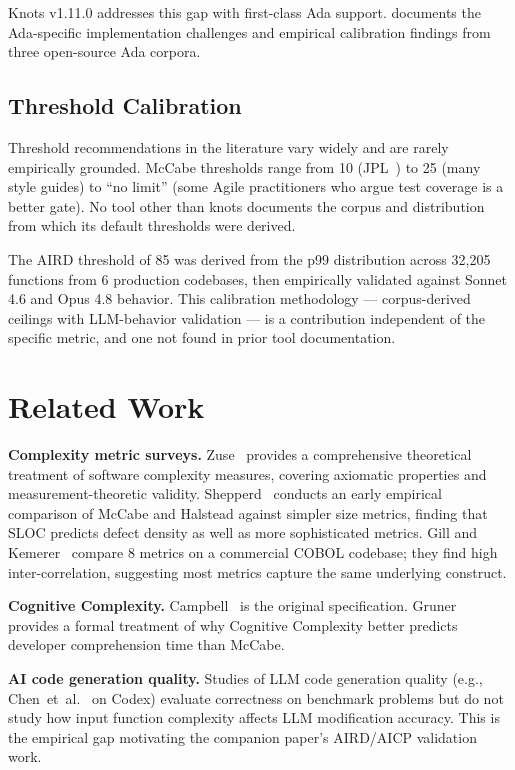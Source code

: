 \documentclass[10pt,twocolumn,letterpaper]{article}
\begin{document}
Knots v1.11.0 addresses this gap with first-class Ada support.
 documents the Ada-specific implementation
challenges and empirical calibration findings from three open-source Ada
corpora.

\subsection{Threshold Calibration}

Threshold recommendations in the literature vary widely and are rarely
empirically grounded.  McCabe thresholds range from 10 (JPL~\cite{jpl})
to 25 (many style guides) to ``no limit'' (some Agile practitioners who
argue test coverage is a better gate).  No tool other than knots documents
the corpus and distribution from which its default thresholds were derived.

The AIRD threshold of 85 was derived from the p99 distribution across
32,205 functions from 6 production codebases, then empirically validated
against Sonnet 4.6 and Opus 4.8 behavior.  This calibration methodology
--- corpus-derived ceilings with LLM-behavior validation --- is
a contribution independent of the specific metric, and one not found in
prior tool documentation.

\section{Related Work}
\label{sec:related}

\textbf{Complexity metric surveys.}
Zuse~\cite{zuse} provides a comprehensive theoretical treatment of software
complexity measures, covering axiomatic properties and measurement-theoretic
validity.  Shepperd~\cite{shepperd} conducts an early empirical comparison
of McCabe and Halstead against simpler size metrics, finding that SLOC
predicts defect density as well as more sophisticated metrics.  Gill and
Kemerer~\cite{gill-kemerer} compare 8 metrics on a commercial COBOL
codebase; they find high inter-correlation, suggesting most metrics capture
the same underlying construct.

\textbf{Cognitive Complexity.}
Campbell~\cite{cognitive-complexity} is the original specification.
Gruner~\cite{gruner} provides a formal treatment of why Cognitive
Complexity better predicts developer comprehension time than McCabe.

\textbf{AI code generation quality.}
Studies of LLM code generation quality (e.g.,
Chen~et~al.~\cite{chen-codex} on Codex) evaluate correctness on benchmark
problems but do not study how input function complexity affects LLM
modification accuracy.  This is the empirical gap motivating the
companion paper's AIRD/AICP validation work.
\end{document}
